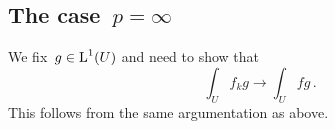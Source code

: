 \subsection*{The case~$p = \infty$}

We fix~$g \in \operatorname{L}^1(U)$ and need to show that
\[
  \int_U f_k g
  \to
  \int_U f g \,.
\]
This follows from the same argumentation as above.





% 
% 
% 




